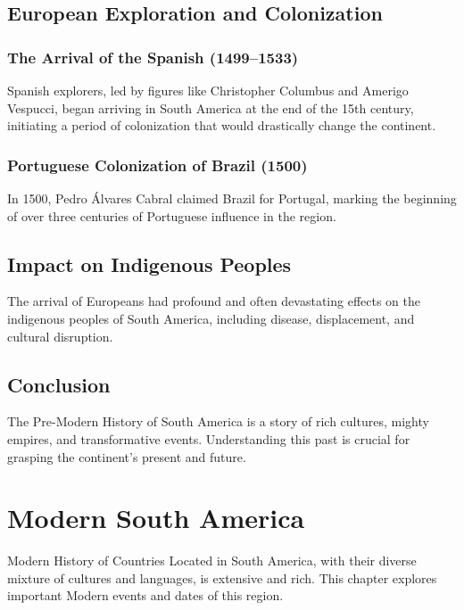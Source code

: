\documentclass{book}
\begin{document}
\section{European Exploration and Colonization}
\label{sec:european-exploration-colonization}

\subsection{The Arrival of the Spanish (1499–1533)}
\label{subsec:arrival-spanish}
Spanish explorers, led by figures like Christopher Columbus and Amerigo Vespucci, began arriving in South America at the end of the 15th century, initiating a period of colonization that would drastically change the continent.

\subsection{Portuguese Colonization of Brazil (1500)}
\label{subsec:portuguese-colonization-brazil}
In 1500, Pedro Álvares Cabral claimed Brazil for Portugal, marking the beginning of over three centuries of Portuguese influence in the region.

\section{Impact on Indigenous Peoples}
\label{sec:impact-indigenous-peoples}
The arrival of Europeans had profound and often devastating effects on the indigenous peoples of South America, including disease, displacement, and cultural disruption.

\section{Conclusion}
\label{sec:conclusion-pre-modern-south-america}
The Pre-Modern History of South America is a story of rich cultures, mighty empires, and transformative events. Understanding this past is crucial for grasping the continent’s present and future.

\chapter{Modern South America}
\label{ch:modern-history-south-america}

Modern History of Countries Located in South America, with their diverse mixture of cultures and languages, is extensive and rich. This chapter explores important Modern events and dates of this region.
\end{document}
